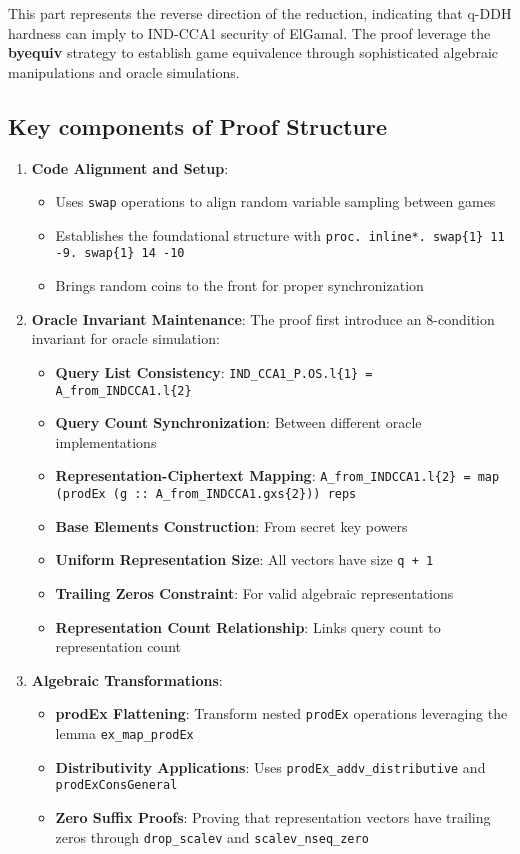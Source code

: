 This part represents the reverse direction of the reduction, indicating that q-DDH hardness can imply to IND-CCA1 security of ElGamal. The proof leverage the \textbf{byequiv} strategy to establish game equivalence through sophisticated algebraic manipulations and oracle simulations.

\subsection{Key components of Proof Structure}

\begin{enumerate}
\item \textbf{Code Alignment and Setup}: 
   \begin{itemize}
   \item Uses \texttt{swap} operations to align random variable sampling between games
   \item Establishes the foundational structure with \texttt{proc. inline*. swap\{1\} 11 -9. swap\{1\} 14 -10}
   \item Brings random coins to the front for proper synchronization
   \end{itemize}

\item \textbf{ Oracle Invariant Maintenance}: 
   The proof first introduce an  8-condition invariant for oracle simulation:
   \begin{itemize}
   \item \textbf{Query List Consistency}: \texttt{IND\_CCA1\_P.OS.l\{1\} = A\_from\_INDCCA1.l\{2\}}
   \item \textbf{Query Count Synchronization}: Between different oracle implementations
   \item \textbf{Representation-Ciphertext Mapping}: \texttt{A\_from\_INDCCA1.l\{2\} = map (prodEx (g :: A\_from\_INDCCA1.gxs\{2\})) reps}
   \item \textbf{Base Elements Construction}: From secret key powers
   \item \textbf{Uniform Representation Size}: All vectors have size \texttt{q + 1}
   \item \textbf{Trailing Zeros Constraint}: For valid algebraic representations
   \item \textbf{Representation Count Relationship}: Links query count to representation count
   \end{itemize}

\item \textbf{Algebraic Transformations}:
   \begin{itemize}
   \item \textbf{prodEx Flattening}: Transform nested \texttt{prodEx} operations leveraging the lemma \texttt{ex\_map\_prodEx}
   \item \textbf{Distributivity Applications}: Uses \texttt{prodEx\_addv\_distributive} and \texttt{prodExConsGeneral}
   \item \textbf{Zero Suffix Proofs}: Proving that representation vectors have trailing zeros through \texttt{drop\_scalev} and \texttt{scalev\_nseq\_zero}
   \end{itemize}


\end{enumerate}
